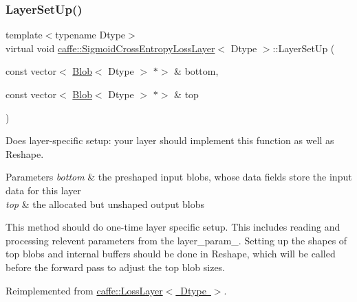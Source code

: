 \subsubsection{\texorpdfstring{Layer\+Set\+Up()}{LayerSetUp()}\hspace{0.1cm}{\footnotesize\ttfamily [1/2]}}
{\footnotesize\ttfamily template$<$typename Dtype$>$ \\
virtual void \mbox{\hyperlink{classcaffe_1_1_sigmoid_cross_entropy_loss_layer}{caffe\+::\+Sigmoid\+Cross\+Entropy\+Loss\+Layer}}$<$ Dtype $>$\+::Layer\+Set\+Up (\begin{DoxyParamCaption}\item[{const vector$<$ \mbox{\hyperlink{classcaffe_1_1_blob}{Blob}}$<$ Dtype $>$ $\ast$$>$ \&}]{bottom,  }\item[{const vector$<$ \mbox{\hyperlink{classcaffe_1_1_blob}{Blob}}$<$ Dtype $>$ $\ast$$>$ \&}]{top }\end{DoxyParamCaption})\hspace{0.3cm}{\ttfamily [virtual]}}



Does layer-\/specific setup\+: your layer should implement this function as well as Reshape. 


\begin{DoxyParams}{Parameters}
{\em bottom} & the preshaped input blobs, whose data fields store the input data for this layer \\
\hline
{\em top} & the allocated but unshaped output blobs\\
\hline
\end{DoxyParams}
This method should do one-\/time layer specific setup. This includes reading and processing relevent parameters from the {\ttfamily layer\+\_\+param\+\_\+}. Setting up the shapes of top blobs and internal buffers should be done in {\ttfamily Reshape}, which will be called before the forward pass to adjust the top blob sizes. 

Reimplemented from \mbox{\hyperlink{classcaffe_1_1_loss_layer_aa6fc7c2e90be66f1c1f0683637c949da}{caffe\+::\+Loss\+Layer$<$ Dtype $>$}}.

\mbox{\label{classcaffe_1_1_sigmoid_cross_entropy_loss_layer_aa1535140dd4eb94557c3afc89076d56d}} 
